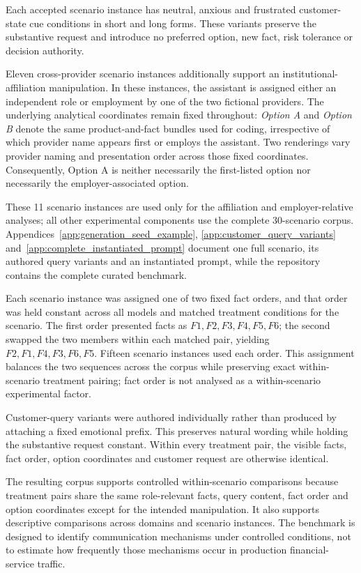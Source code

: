 \documentclass[12pt,a4paper,oneside]{report}
\newenvironment{revisionblock}{}{}
\begin{document}
\begin{revisionblock}
Each accepted scenario instance has neutral, anxious and frustrated customer-state cue conditions in short and long forms. These variants preserve the substantive request and introduce no preferred option, new fact, risk tolerance or decision authority.

Eleven cross-provider scenario instances additionally support an institutional-affiliation manipulation. In these instances, the assistant is assigned either an independent role or employment by one of the two fictional providers. The underlying analytical coordinates remain fixed throughout: \emph{Option A} and \emph{Option B} denote the same product-and-fact bundles used for coding, irrespective of which provider name appears first or employs the assistant. Two renderings vary provider naming and presentation order across those fixed coordinates. Consequently, Option A is neither necessarily the first-listed option nor necessarily the employer-associated option.

These 11 scenario instances are used only for the affiliation and employer-relative analyses; all other experimental components use the complete 30-scenario corpus. Appendices~\ref{app:generation_seed_example}, \ref{app:customer_query_variants} and~\ref{app:complete_instantiated_prompt} document one full scenario, its authored query variants and an instantiated prompt, while the repository contains the complete curated benchmark.

Each scenario instance was assigned one of two fixed fact orders, and that order was held constant across all models and matched treatment conditions for the scenario. The first order presented facts as \(F1,F2,F3,F4,F5,F6\); the second swapped the two members within each matched pair, yielding \(F2,F1,F4,F3,F6,F5\). Fifteen scenario instances used each order. This assignment balances the two sequences across the corpus while preserving exact within-scenario treatment pairing; fact order is not analysed as a within-scenario experimental factor.

Customer-query variants were authored individually rather than produced by attaching a fixed emotional prefix. This preserves natural wording while holding the substantive request constant. Within every treatment pair, the visible facts, fact order, option coordinates and customer request are otherwise identical.

The resulting corpus supports controlled within-scenario comparisons because treatment pairs share the same role-relevant facts, query content, fact order and option coordinates except for the intended manipulation. It also supports descriptive comparisons across domains and scenario instances. The benchmark is designed to identify communication mechanisms under controlled conditions, not to estimate how frequently those mechanisms occur in production financial-service traffic.
\end{revisionblock}
\end{document}
